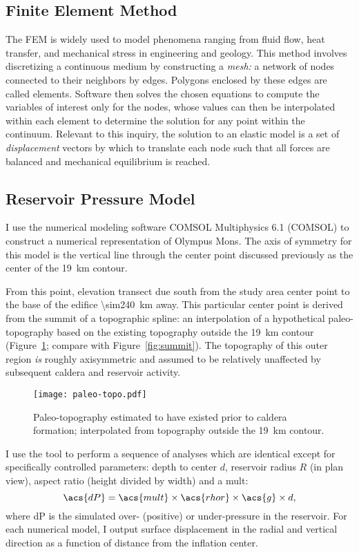 \subsection{Finite Element Method}

The \ac{FEM} is widely used to model phenomena ranging from fluid flow, heat transfer, and mechanical stress in engineering and geology. This method involves discretizing a continuous medium by constructing a \emph{mesh:} a network of nodes connected to their neighbors by edges. Polygons enclosed by these edges are called elements. Software then solves the chosen equations to compute the variables of interest only for the nodes, whose values can then be interpolated within each element to determine the solution for any point within the continuum. Relevant to this inquiry, the solution to an elastic model is a set of \emph{displacement} vectors by which to translate each node such that all forces are balanced and mechanical equilibrium is reached.

\subsection{Reservoir Pressure Model}

I use the numerical modeling software COMSOL Multiphysics 6.1 (COMSOL) to construct a numerical representation of Olympus Mons. The axis of symmetry for this model is the vertical line through the center point discussed previously as the center of the \qty{19}{\km} contour.

From this point, elevation transect due south from the study area center point to the base of the edifice \qty{\sim240}{\km} away. This particular center point is derived from the summit of a topographic spline: an interpolation of a hypothetical paleo-topography based on the existing topography outside the \qty{19}{\km} contour (Figure~\ref{fig:paleo-topo}; compare with Figure~\ref{fig:summit}). The topography of this outer region \emph{is} roughly axisymmetric and assumed to be relatively unaffected by subsequent caldera and reservoir activity.

\begin{figure}
    \texttt{[image: paleo-topo.pdf]}
    \caption[Spline-derived paleo-topography]{Paleo-topography estimated to have existed prior to caldera formation; interpolated from topography outside the \qty{19}{\km} contour.}%
    \label{fig:paleo-topo}
\end{figure}

I use the  tool to perform a sequence of analyses which are identical except for specifically controlled parameters: depth to center $d$, reservoir radius $R$ (in plan view), aspect ratio (height divided by width) and a \ac{mult}:
\begin{equation}
    \acs{dP}=\acs{mult}\times\acs{rhor}\times\acs{g}\times d,
\end{equation}
where \acs{dP} is the simulated over- (positive) or under-pressure in the reservoir. For each numerical model, I output surface displacement in the radial and vertical direction as a function of distance from the inflation center. 

